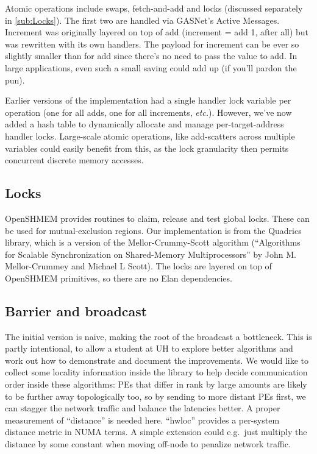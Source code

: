 \documentclass[english]{article}
\begin{document}
Atomic operations include swaps, fetch-and-add and locks (discussed
separately in \ref{sub:Locks}). The first two are handled via GASNet's
Active Messages. Increment was originally layered on top of add
(increment = add 1, after all) but was rewritten with its own
handlers. The payload for increment can be ever so slightly smaller
than for add since there's no need to pass the value to add. In large
applications, even such a small saving could add up (if you'll pardon
the pun).

Earlier versions of the implementation had a single handler lock
variable per operation (one for all adds, one for all increments,
\emph{etc.}).  However, we've now added a hash table to dynamically
allocate and manage per-target-address handler locks. Large-scale
atomic operations, like add-scatters across multiple variables could
easily benefit from this, as the lock granularity then permits
concurrent discrete memory accesses.

\subsection{\label{sub:Locks}Locks}

OpenSHMEM provides routines to claim, release and test global locks.
These can be used for mutual-exclusion regions. Our implementation is
from the Quadrics library, which is a version of the
Mellor-Crummy-Scott algorithm (``Algorithms for Scalable
Synchronization on Shared-Memory Multiprocessors'' by John
M. Mellor-Crummey and Michael L Scott).  The locks are layered on top
of OpenSHMEM primitives, so there are no Elan dependencies.

\subsection{Barrier and broadcast}

The initial version is naive, making the root of the broadcast a
bottleneck.  This is partly intentional, to allow a student at UH to
explore better algorithms and work out how to demonstrate and document
the improvements. We would like to collect some locality information
inside the library to help decide communication order inside these
algorithms: PEs that differ in rank by large amounts are likely to be
further away topologically too, so by sending to more distant PEs
first, we can stagger the network traffic and balance the latencies
better. A proper measurement of ``distance'' is needed here. ``hwloc''
provides a per-system distance metric in NUMA terms. A simple
extension could e.g.\ just multiply the distance by some constant when
moving off-node to penalize network traffic.
\end{document}
